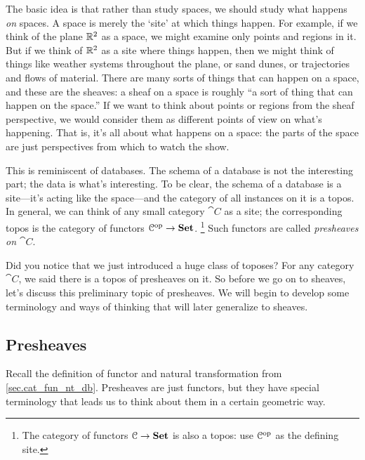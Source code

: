 \documentclass[7Sketches]{subfiles}
\begin{document}
The basic idea is that rather than study spaces, we should study what happens
\emph{on} spaces. A space is merely the `site' at which things happen. For
example, if we think of the plane $\mathbb{R}^2$ as a space, we might examine only
points and regions in it.  But if we think of $\mathbb{R}^2$ as a site where things happen,
then we might think of things like weather systems throughout the plane, or sand
dunes, or trajectories and flows of material. There are many sorts of things
that can happen on a space, and these are the sheaves: a sheaf on a space is roughly ``a
sort of thing that can happen on the space.'' If we want to think about points
or regions from the sheaf perspective, we would consider them as different points of view on what's happening. That is, it's all about
what happens on a space: the parts of the space are just perspectives from which
to watch the show.%

This is reminiscent of databases. The schema of a database is not the interesting part; the data is what's interesting. To be clear, the schema of a database is a site---it's acting like the space---and the category of all instances on it is a topos. In general, we can think of any small category $\cat{C}$ as a site; the corresponding topos is the category of functors $\mathcal{C}^{\textnormal{op}}\to\mathbf{Set}$.%
\footnote{The category of functors $\mathcal{C}\to\mathbf{Set}$ is also a topos: use
$\mathcal{C}^{\textnormal{op}}$ as the defining site.}%
Such functors are called \emph{presheaves on $\cat{C}$}.%
%

Did you notice that we just introduced a huge class of toposes? For any category $\cat{C}$, we said there is a topos of presheaves on it. So before we go on to sheaves, let's discuss this preliminary topic of presheaves. We will begin to develop some terminology and ways of thinking that will later generalize to sheaves.%

\subsection{Presheaves}%
\label{subsec.what_are_toposes}%

Recall the definition of functor and natural transformation from \cref{sec.cat_fun_nt_db}. Presheaves are just functors, but they have special terminology that leads us to think about them in a certain geometric way.
\end{document}
